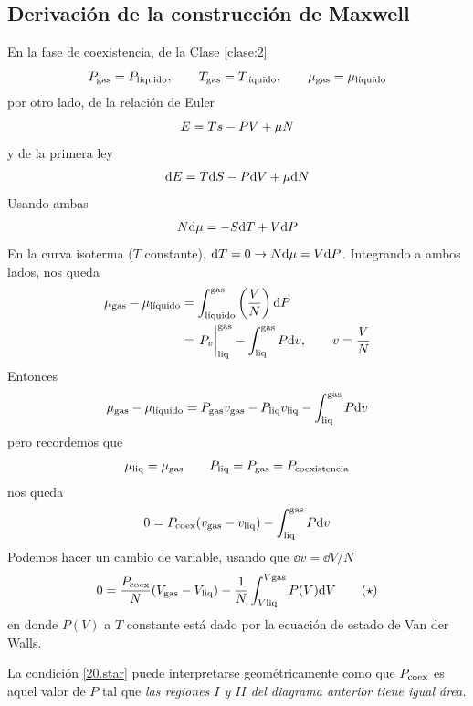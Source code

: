 \subsection{Derivación de la construcción de Maxwell}
En la fase de coexistencia, de la Clase \ref{clase:2}
\begin{equation}
  P_{\rm gas}=P_{\text{líquido}},\qquad  T_{\rm gas}=T_{\text{líquido}},\qquad  \mu _{\rm gas}=\mu _{\text{líquido}}
\end{equation}
por otro lado, de la relación de Euler
\begin{equation}
  E=Ts-PV+\mu N
\end{equation}
y de la primera ley
\begin{equation}
  \dd E=T\dd S-P\dd V+\mu \dd N
\end{equation}
Usando ambas
\begin{equation}
  N\dd\mu =-S\dd T+V\dd P
\end{equation}
En la curva isoterma ($T$ constante), $\dd T=0\rightarrow N\dd\mu =V\dd P$. Integrando a ambos lados, nos queda
\begin{align}
  \m_{\rm gas}-\m_{\text{líquido}}&=\int_{\text{líquido}}^{\rm gas}\left(\frac{V}{N}\right)\dd P\\
  &=\eval{P_v}_{\text{liq}}^{\rm gas}-\int_{\rm liq}^{\rm gas}P\dd v,\qquad v=\frac{V}{N}
\end{align}
Entonces
\begin{equation}
  \mu_{\rm gas}-\mu_{\text{líquido}}=P_{\rm gas}v_{\rm gas}-P_{\rm liq}v_{\rm liq}-\int_{\rm liq}^{\rm gas}P\dd v
\end{equation}
pero recordemos que
\begin{equation}
  \mu_{\rm liq}=\mu_{\rm gas}\qquad P_{\rm liq}=P_{\rm gas}=P_{\rm coexistencia}
\end{equation}
nos queda
\begin{equation}
  0=P_{\rm coex}(v_{\rm gas}-v_{\rm liq})-\int_{\rm liq}^{\rm gas}P\dd v
\end{equation}
Podemos hacer un cambio de variable, usando que $\dd v=\dd V/N$
\begin{equation}\label{20.star}
  0=\frac{P_{\rm coex}}{N}(V_{\rm gas}-V_{\rm liq})-\frac{1}{N}\int_{V\rm liq}^{V\rm gas}P(V)\dd V\qquad  (\star)
\end{equation}
en donde $P(V)$ a $T$ constante está dado por la ecuación de estado de Van der Walls.

La condición \eqref{20.star} puede interpretarse geométricamente como que $P_{\rm coex}$ es aquel valor de $P$ tal que \textit{las regiones $I$ y $II$ del diagrama anterior tiene igual área.}


